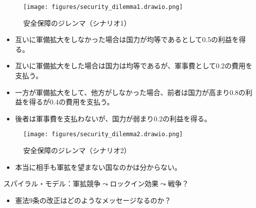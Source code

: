 \documentclass[
  xelatex,
  ja=standard]{bxjsarticle}
\providecommand{\tightlist}{%
  \setlength{\itemsep}{0pt}\setlength{\parskip}{0pt}}\usepackage{longtable,booktabs,array}
\begin{document}
\begin{figure}[htpb]

{\centering \texttt{[image: figures/security\_dilemma1.drawio.png]}

}

\caption{安全保障のジレンマ（シナリオ1）}

\end{figure}

\begin{tcolorbox}[enhanced jigsaw, coltitle=black, colbacktitle=quarto-callout-tip-color!10!white, colframe=quarto-callout-tip-color-frame, bottomrule=.15mm, toprule=.15mm, breakable, leftrule=.75mm, toptitle=1mm, left=2mm, arc=.35mm, bottomtitle=1mm, opacitybacktitle=0.6, titlerule=0mm, title=\textcolor{quarto-callout-tip-color}{\faLightbulb}\hspace{0.5em}{安全保障のジレンマ（シナリオ2）}, colback=white, opacityback=0, rightrule=.15mm]

\begin{itemize}
\tightlist
\item
  互いに軍備拡大をしなかった場合は国力が均等であるとして0.5の利益を得る。
\item
  互いに軍備拡大をした場合は国力は均等であるが、軍事費として0.2の費用を支払う。
\item
  一方が軍備拡大をして、他方がしなかった場合、前者は国力が高まり0.8の利益を得るが0.4の費用を支払う。
\item
  後者は軍事費を支払わないが、国力が弱まり0.2の利益を得る。
\end{itemize}

\end{tcolorbox}

\begin{figure}[htpb]

{\centering \texttt{[image: figures/security\_dilemma2.drawio.png]}

}

\caption{安全保障のジレンマ（シナリオ2）}

\end{figure}

\begin{itemize}
\tightlist
\item
  本当に相手も軍拡を望まない国なのかは分からない。
\end{itemize}

スパイラル・モデル：軍拡競争\(\leadsto\)ロックイン効果\(\leadsto\)戦争？

\begin{itemize}
\tightlist
\item
  憲法9条の改正はどのようなメッセージなるのか？
\end{itemize}
\end{document}
